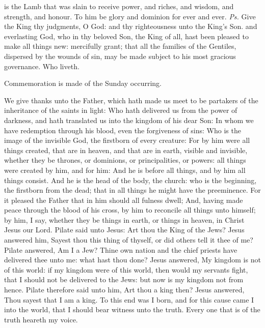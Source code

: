 \introit
{} is the Lamb that was slain to receive power, and riches, and wisdom, and strength, and honour. To him be glory and dominion for ever and ever. \textit{Ps.} Give the King thy judgments, O God: and thy righteousness unto the King's Son.
\collect
{} and everlasting God, who in thy beloved Son, the King of all, hast been pleased to make all things new: mercifully grant; that all the families of the Gentiles, dispersed by the wounds of sin, may be made subject to his most gracious governance. Who liveth.
\begin{rubric}
    Commemoration is made of the Sunday occurring.
\end{rubric}
 We give thanks unto the Father, which hath made us meet to be partakers of the inheritance of the saints in light: Who hath delivered us from the power of darkness, and hath translated us into the kingdom of his dear Son: In whom we have redemption through his blood, even the forgiveness of sins: Who is the image of the invisible God, the firstborn of every creature: For by him were all things created, that are in heaven, and that are in earth, visible and invisible, whether they be thrones, or dominions, or principalities, or powers: all things were created by him, and for him: And he is before all things, and by him all things consist. And he is the head of the body, the church: who is the beginning, the firstborn from the dead; that in all things he might have the preeminence. For it pleased the Father that in him should all fulness dwell; And, having made peace through the blood of his cross, by him to reconcile all things unto himself; by him, I say, whether they be things in earth, or things in heaven, %
in Christ Jesus our Lord.
 Pilate said unto Jesus: Art thou the King of the Jews? Jesus answered him, Sayest thou this thing of thyself, or did others tell it thee of me? Pilate answered, Am I a Jew? Thine own nation and the chief priests have delivered thee unto me: what hast thou done? Jesus answered, My kingdom is not of this world: if my kingdom were of this world, then would my servants fight, that I should not be delivered to the Jews: but now is my kingdom not from hence. Pilate therefore said unto him, Art thou a king then? Jesus answered, Thou sayest that I am a king. To this end was I born, and for this cause came I into the world, that I should bear witness unto the truth. Every one that is of the truth heareth my voice.

